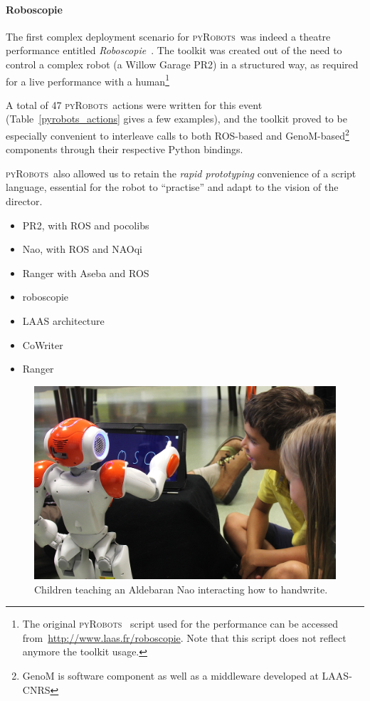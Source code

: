 \documentclass[a4paper, 10pt, conference]{ieeeconf}      %
\newcommand{\pyRobots}{\textsc{pyRobots}\ }
\begin{document}
\paragraph{Roboscopie} The first complex deployment scenario for \pyRobots was
indeed a theatre performance entitled
\emph{Roboscopie}~\cite{lemaignan2012roboscopie}. The toolkit was created out of
the need to control a complex robot (a Willow Garage PR2) in a structured way,
as required for a live performance with a human\footnote{The original \pyRobots
script used for the performance can be accessed
from~\url{http://www.laas.fr/roboscopie}. Note that this script does not
reflect anymore the toolkit usage.}

A total of 47 \pyRobots actions were written for this event
(Table~\ref{pyrobots_actions} gives a few examples), and the toolkit proved to
be especially convenient to interleave calls to both ROS-based and {\sc
GenoM}-based\footnote{{\sc GenoM} is software component as well as a middleware
developed at LAAS-CNRS} components through their respective Python bindings.

\pyRobots also allowed us to retain the \emph{rapid prototyping} convenience of a
script language, essential for the robot to ``practise'' and adapt to the
vision of the director.

\begin{itemize}
    \item PR2, with ROS and pocolibs
    \item Nao, with ROS and NAOqi
    \item Ranger with Aseba and ROS
\end{itemize}


\begin{itemize}
    \item roboscopie
    \item LAAS architecture
    \item CoWriter
    \item Ranger
\end{itemize}

\begin{figure}
        \centering
        \includegraphics[width=0.9\columnwidth]{cowriter}
        \caption{Children teaching an Aldebaran Nao interacting how to
        handwrite.}
        \label{expe-cowriter}
\end{figure}
\end{document}
